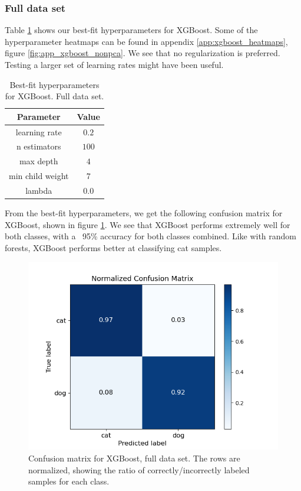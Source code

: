 \documentclass[a4paper]{article}
\begin{document}
\subsubsection{Full data set}
Table \ref{tab:best_fit_xgboost_nonpca} shows our best-fit hyperparameters for XGBoost. Some of the hyperparameter heatmaps can be found in appendix \ref{app:xgboost_heatmaps}, figure \ref{fig:app_xgboost_nonpca}. We see that no regularization is preferred. Testing a larger set of learning rates might have been useful.
\begin{table}[H]
  \centering
  \caption{Best-fit hyperparameters for XGBoost. Full data set.}
  \label{tab:best_fit_xgboost_nonpca}
  \begin{tabular}{c|c}
    \hline\hline
    Parameter & Value\\\hline
    learning rate  & $0.2$\\
    n estimators &  $100$\\
    max depth &  $4$\\
    min child weight & $7$ \\
    lambda & $0.0$
    \end{tabular}
\end{table}
From the best-fit hyperparameters, we get the following confusion matrix for XGBoost, shown in figure \ref{fig:xgboost_confusion_nonpca}. We see that XGBoost performs extremely well for both classes, with a ~95\% accuracy for both classes combined. Like with random forests, XGBoost performs better at classifying cat samples.
\begin{figure}[H]
	\centering
	\includegraphics[scale=0.6]{../figures/xgboost/confusion_matrix_nbins200_pca0_seed4155_ts0.20.png}
	\caption{Confusion matrix for XGBoost, full data set. The rows are normalized, showing the ratio of correctly/incorrectly labeled samples for each class.}
	\label{fig:xgboost_confusion_nonpca}
\end{figure}
\end{document}
